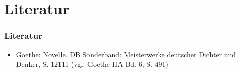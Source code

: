 \documentclass[ddcfooter]{tudbeamer}
\begin{document}
\section{Literatur}
\begin{frame}
\frametitle{Literatur}
\begin{itemize}
\item Goethe: Novelle. DB Sonderband: Meisterwerke deutscher Dichter und Denker, S. 12111 (vgl. Goethe-HA Bd. 6, S. 491)
\end{itemize}
\end{frame}

 
\end{document}
